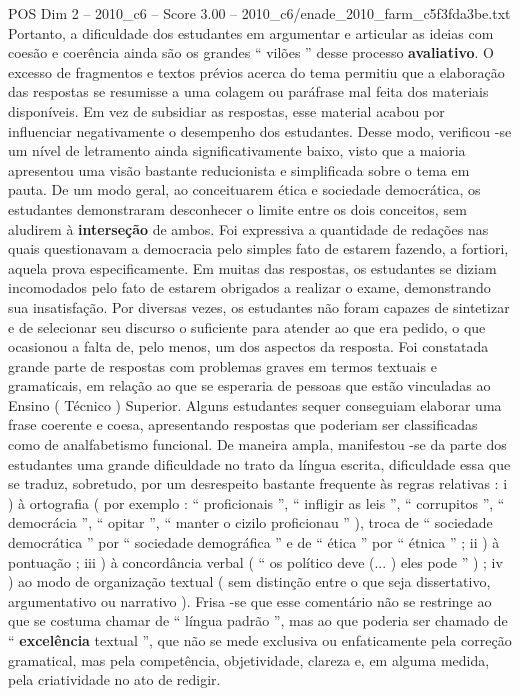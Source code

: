 \begin{textsample}{POS Dim 2 – 2010\_c6 – Score 3.00 – 2010\_c6/enade\_2010\_farm\_c5f3fda3be.txt}
Portanto, a dificuldade dos estudantes em argumentar e articular as ideias com coesão e coerência ainda são os grandes “ vilões ” desse processo \textbf{avaliativo}.
O excesso de fragmentos e textos prévios acerca do tema permitiu que a elaboração das respostas se resumisse a uma colagem ou paráfrase mal feita dos materiais disponíveis.
Em vez de subsidiar as respostas, esse material acabou por influenciar negativamente o desempenho dos estudantes.
Desse modo, verificou -se um nível de letramento ainda significativamente baixo, visto que a maioria apresentou uma visão bastante reducionista e simplificada sobre o tema em pauta.
De um modo geral, ao conceituarem ética e sociedade democrática, os estudantes demonstraram desconhecer o limite entre os dois conceitos, sem aludirem à \textbf{interseção} de ambos.
Foi expressiva a quantidade de redações nas quais questionavam a democracia pelo simples fato de estarem fazendo, a fortiori, aquela prova especificamente.
Em muitas das respostas, os estudantes se diziam incomodados pelo fato de estarem obrigados a realizar o exame, demonstrando sua insatisfação.
Por diversas vezes, os estudantes não foram capazes de sintetizar e de selecionar seu discurso o suficiente para atender ao que era pedido, o que ocasionou a falta de, pelo menos, um dos aspectos da resposta.
Foi constatada grande parte de respostas com problemas graves em termos textuais e gramaticais, em relação ao que se esperaria de pessoas que estão vinculadas ao Ensino ( Técnico ) Superior.
Alguns estudantes sequer conseguiam elaborar uma frase coerente e coesa, apresentando respostas que poderiam ser classificadas como de analfabetismo funcional.
De maneira ampla, manifestou -se da parte dos estudantes uma grande dificuldade no trato da língua escrita, dificuldade essa que se traduz, sobretudo, por um desrespeito bastante frequente às regras relativas : i ) à ortografia ( por exemplo : “ proficionais ”, “ infligir as leis ”, “ corrupitos ”, “ democrácia ”, “ opitar ”, “ manter o cizilo proficionau ” ), troca de “ sociedade democrática ” por “ sociedade demográfica ” e de “ ética ” por “ étnica ” ; ii ) à pontuação ; iii ) à concordância verbal ( “ os político deve (... ) eles pode ” ) ; iv ) ao modo de organização textual ( sem distinção entre o que seja dissertativo, argumentativo ou narrativo ).
Frisa -se que esse comentário não se restringe ao que se costuma chamar de “ língua padrão ”, mas ao que poderia ser chamado de “ \textbf{excelência} textual ”, que não se mede exclusiva ou enfaticamente pela correção gramatical, mas pela competência, objetividade, clareza e, em alguma medida, pela criatividade no ato de redigir.

\end{textsample}
